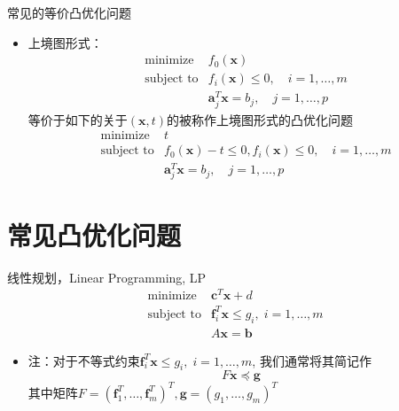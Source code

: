 \documentclass[10pt]{beamer}
\begin{document}
\begin{frame}

\begin{block}{常见的等价凸优化问题}
\begin{itemize}
\item 上境图形式：
\begin{eqnarray*}
& \text{minimize} & f_0(\mathbf{x}) \\
& \text{subject to} & f_i(\mathbf{x}) \le 0, \quad i = 1,\ldots,m \\
& & \mathbf{a}_j^T\mathbf{x} = b_j, \quad j = 1,\ldots,p
\end{eqnarray*}
等价于如下的关于$(\mathbf{x},t)$的被称作上境图形式的凸优化问题
\begin{eqnarray*}
& \text{minimize} & t \\
& \text{subject to} & f_0(\mathbf{x}) - t \le 0, f_i(\mathbf{x}) \le 0, \quad i = 1,\ldots,m \\
& & \mathbf{a}_j^T\mathbf{x} = b_j, \quad j = 1,\ldots,p
\end{eqnarray*}
\end{itemize}
\end{block}

\end{frame}


\section{常见凸优化问题}


\begin{frame}

\begin{block}{线性规划，Linear Programming, LP}
\begin{eqnarray*}
& \text{minimize} & \mathbf{c}^T \mathbf{x} + d \\
& \text{subject to} & \mathbf{f}_i^T \mathbf{x} \le g_i, \; i = 1,\ldots,m \\
& & A\mathbf{x} = \mathbf{b}
\end{eqnarray*}

\begin{itemize}
\item 注：对于不等式约束$\mathbf{f}_i^T \mathbf{x} \le g_i, \; i = 1,\ldots,m$, 我们通常将其简记作
$$F\mathbf{x} \preccurlyeq \mathbf{g}$$
其中矩阵$F = (\mathbf{f}_1^T, \ldots, \mathbf{f}_m^T)^T, \mathbf{g} = (g_1, \ldots, g_m)^T$
\end{itemize}
\end{block}

\end{frame}
\end{document}
